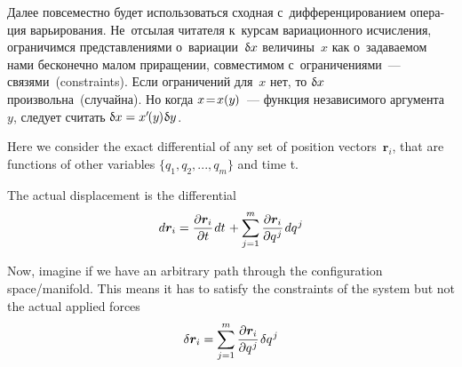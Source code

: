 

\begin{otherlanguage}{russian}

Далее повсеместно будет использоваться сходная с~дифференцированием операция варьирования. Не~отсылая читателя к~курсам вариационного исчисления, ограничимся представлениями о~вариации~${\updelta\hspace{-0.1ex}x}$ величины~$x$ как о~задаваемом нами бесконечно малом приращении, совместимом с~ограничениями~--- связями~(constraints). Если ограничений для~$x$ нет, то ${\updelta\hspace{-0.1ex}x}$ произвольна~(случайна). Но когда ${x \!=\! x(y\hspace{-0.1ex})}$~--- функция независимого аргумента~$y$, следует считать ${\updelta\hspace{-0.1ex}x = x'\hspace{-0.25ex}(y\hspace{-0.1ex}) \hspace{0.1ex} \updelta\hspace{-0.1ex}y}$.



{\small
\setlength{\abovedisplayskip}{2pt}\setlength{\belowdisplayskip}{2pt}

Here we consider the exact differential of any set of position vectors~$\bm{r}_i$, that are functions of other variables ${\displaystyle \lbrace q_{1},q_{2},...,q_{m}\rbrace }$ and time t.

The actual displacement is the differential
\[\displaystyle d\bm{r}_{i} = \frac{\partial \bm{r}_{i}}{\partial t} \hspace{.16ex} dt \hspace{.2ex} + \sum_{j=1}^{m} {\frac{\partial \bm{r}_{i}}{\partial q^{\hspace{.1ex}j}}} \hspace{.2ex} dq^{\hspace{.1ex}j}\]

Now, imagine if we have an arbitrary path through the configuration space/manifold. This means it has to satisfy the constraints of the system but not the actual applied forces
\[\displaystyle \delta \bm{r}_{i}=\sum _{j=1}^{m} {\frac {\partial \bm{r}_{i}}{\partial q^{\hspace{.1ex}j}}} \hspace{.2ex} \delta q^{\hspace{.1ex}j}\]

}
\end{otherlanguage}

